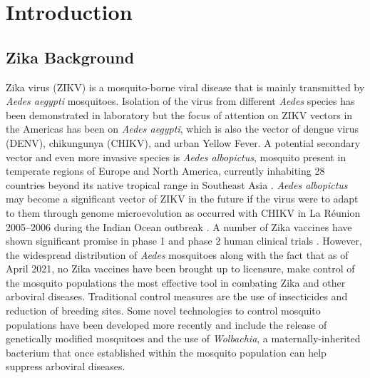 \documentclass{ws-rv9x6}
\begin{document}

\body

\newtheorem{theorem}{Theorem}

\section{Introduction}
\subsection{Zika Background}
Zika virus (ZIKV) is a mosquito-borne viral disease that is mainly transmitted by \textit{Aedes aegypti} mosquitoes. Isolation of the virus from different \textit{Aedes} species has been demonstrated in laboratory but the focus of attention on ZIKV vectors in the Americas has
been on \textit{Aedes aegypti}, which is also the vector of dengue virus (DENV), chikungunya (CHIKV), and urban
Yellow Fever. A potential secondary vector and even more invasive species is \textit{Aedes albopictus}, mosquito present in temperate regions of
Europe and North America, currently inhabiting 28 countries
beyond its native tropical range in Southeast Asia \cite{enserink2008mosquito}. \textit{Aedes albopictus} may become a significant
vector of ZIKV in the future if the virus were to adapt to them
through genome microevolution as occurred with CHIKV in
La Réunion 2005–2006 during the Indian Ocean outbreak \cite{schuffenecker2006genome}. A number of Zika vaccines have shown significant promise in phase 1 and phase 2 human clinical trials \cite{pattnaik2020current}. However, the widespread distribution of \textit{Aedes} mosquitoes along with the fact that as of April 2021, no Zika vaccines have been brought up to licensure, make control of the mosquito populations the most effective tool in combating Zika and other arboviral diseases. Traditional control measures are the use of insecticides and reduction of breeding sites. Some novel technologies to control mosquito populations have been developed more recently and include the release of genetically modified mosquitoes and the use of \textit{Wolbachia}, a maternally-inherited bacterium that once established within the mosquito population can help suppress arboviral diseases. 
\end{document}
